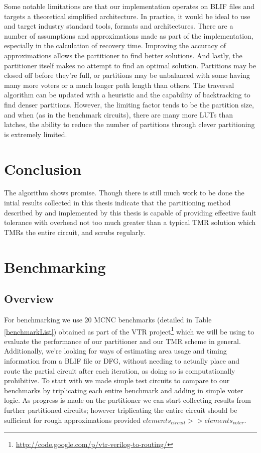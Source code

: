 \documentclass[12pt,final,oneside]{dwThesis} %
\begin{document}
   Some notable limitations are that our implementation operates on \ac{BLIF} files and targets a theoretical simplified architecture. In practice, it would be ideal to use and target industry standard tools, formats and architectures.
   There are a number of assumptions and approximations made as part of the implementation, especially in the calculation of recovery time. Improving the accuracy of approximations allows the partitioner to find better solutions.
   And lastly, the partitioner itself makes no attempt to find an optimal solution. Partitions may be closed off before they're full, or partitions may be unbalanced with some having many more voters or a much longer path length than others.
   The traversal algorithm can be updated with a heuristic and the capability of backtracking to find denser partitions. However, the limiting factor tends to be the partition size, and when (as in the benchmark circuits), there are many more \acp{LUT} than latches, the ability to reduce the number of partitions through clever partitioning is extremely limited.

   \chapter{Conclusion}
   The algorithm shows promise. Though there is still much work to be done the intial results collected in this thesis indicate that the partitioning method described by  and implemented by this thesis is capable of providing effective fault tolerance with overhead not too much greater than a typical \ac{TMR} solution which \ac{TMR}s the entire circuit, and scrubs regularly.



   \chapter{Benchmarking}
   \section{Overview}

   For benchmarking we use 20 MCNC benchmarks (detailed in Table \ref{benchmarkList}) obtained as part of the \ac{VTR} project\footnote{\url{http://code.google.com/p/vtr-verilog-to-routing/}} which we will be using to evaluate the performance of our partitioner and our \ac{TMR} scheme in general.
   Additionally, we're looking for ways of estimating area usage and timing information from a \ac{BLIF} file or \ac{DFG}, without needing to actually place and route the partial circuit after each iteration, as doing so is computationally prohibitive.
   To start with we made simple test circuits to compare to our benchmarks by triplicating each entire benchmark and adding in simple voter logic. As progress is made on the partitioner we can start collecting results from further partitioned circuits; however triplicating the entire circuit should be sufficient for rough approximations provided $elements_{circuit} >> elements_{voter}$.
\end{document}
